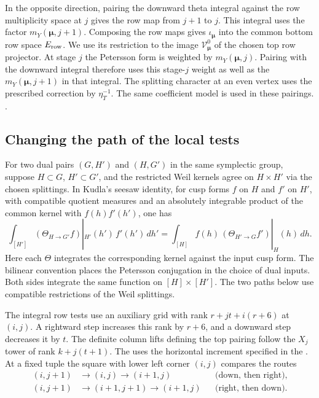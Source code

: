 In the opposite direction, pairing the downward theta integral against
the row multiplicity space at \(j\) gives the row map from \(j+1\) to
\(j\). This integral uses the factor \(m_Y(\boldsymbol\mu,j+1)\).
Composing the row maps gives \(\iota_{\boldsymbol\mu}\) into the common
bottom row space \(E_{\rm row}\). We use its restriction to the image
\(\mathcal V^0_{\boldsymbol\mu}\) of the chosen top row projector.
At stage \(j\) the Petersson form is weighted by \(m_Y(\boldsymbol\mu,j)\).
Pairing with the downward integral therefore uses this stage-\(j\)
weight as well as the \(m_Y(\boldsymbol\mu,j+1)\) in that integral.
The splitting character at an even vertex uses the prescribed correction
by \(\eta_T^{-1}\). The same coefficient model is used in these pairings.
.

\subsection{Changing the path of the local tests}

For two dual pairs \((G,H')\) and \((H,G')\) in the same symplectic
group, suppose \(H\subset G\), \(H'\subset G'\), and the restricted
Weil kernels agree on \(H\times H'\) via the chosen splittings. In
Kudla's seesaw identity, for cusp forms \(f\) on \(H\) and \(f'\) on
\(H'\), with compatible quotient measures and an absolutely integrable
product of the common kernel with \(f(h)f'(h')\), one has
\[
 \int_{[H']}(\Theta_{H\to G'}f)|_{H'}(h')\,f'(h')\,dh'
 =
 \int_{[H]} f(h)\,(\Theta_{H'\to G}f')|_H(h)\,dh .
\]
Here each \(\Theta\) integrates the corresponding kernel against the
input cusp form. The bilinear convention places the Petersson
conjugation in the choice of dual inputs. Both sides integrate the
same function on \([H]\times[H']\).
\cite[\S1, Definition~1.3 and (1.14)]{seesaw}
The two paths below use compatible restrictions of the Weil splittings.

The integral row tests use an auxiliary grid with rank
\(r+jt+i(r+6)\) at \((i,j)\). A rightward step increases this rank
by \(r+6\), and a downward step decreases it by \(t\). The definite
column lifts defining the top pairing follow the \(X_j\) tower of
rank \(k+j(t+1)\). The
uses the horizontal increment specified in the
.
At a fixed tuple the square with lower left corner \((i,j)\)
compares the routes
\[
 \begin{aligned}
 (i,j+1)&\longrightarrow(i,j)\longrightarrow(i+1,j)
             &&\text{(down, then right)},\\
 (i,j+1)&\longrightarrow(i+1,j+1)\longrightarrow(i+1,j)
             &&\text{(right, then down)}.
 \end{aligned}
\]

